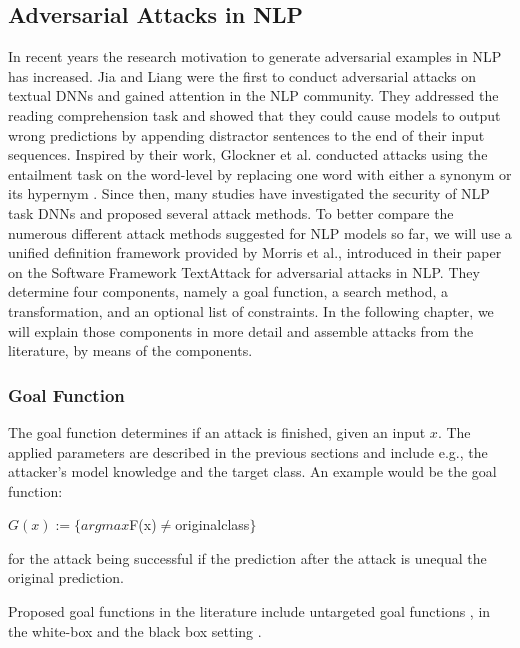\subsection{Adversarial Attacks in NLP}
\label{sec:adv-ex_in_NLP}

In recent years the research motivation to generate adversarial examples in NLP has increased. Jia and Liang were the first to conduct adversarial attacks on textual DNNs and gained attention in the NLP community\cite{Jia2017AdversarialEF}. They addressed the reading comprehension task and showed that they could cause models to output wrong predictions by appending distractor sentences to the end of their input sequences. Inspired by their work, Glockner et al. conducted attacks using the entailment task on the word-level by replacing one word with either a synonym or its hypernym \cite{glockner2018breaking}. Since then, many studies have investigated the security of NLP task DNNs and proposed several attack methods. 
To better compare the numerous different attack methods suggested for NLP models so far, we will use a unified definition framework provided by Morris et al., introduced in their paper on the Software Framework TextAttack for adversarial attacks in NLP\cite{morris2020textattack}. They determine four components, namely a goal function, a search method, a transformation, and an optional list of constraints. In the following chapter, we will explain those components in more detail and assemble attacks from the literature, by means of the components.


\subsubsection{Goal Function}
\label{sec:goal_funciton}
The goal function determines if an attack is finished, given an input $x$. 
The applied parameters are described in the previous sections and include e.g., the attacker's model knowledge and the target class.
An example would be the goal function:

$G(x):= \{argmax$F(x)$ \neq $original\textunderscore class$\}$

for the attack being successful if the prediction after the attack is unequal the original prediction. 

Proposed goal functions in the literature include untargeted goal functions \cite{ebrahimi2017hotflip, alzantot2018generating, li2018textbugger, jin2019bert, garg2020bae}, in the white-box \cite{papernot2016crafting, liang2017deep, ebrahimi2017hotflip, jin2019bert} and the black box setting \cite{gao2018black, goodman2020fastwordbug}.

